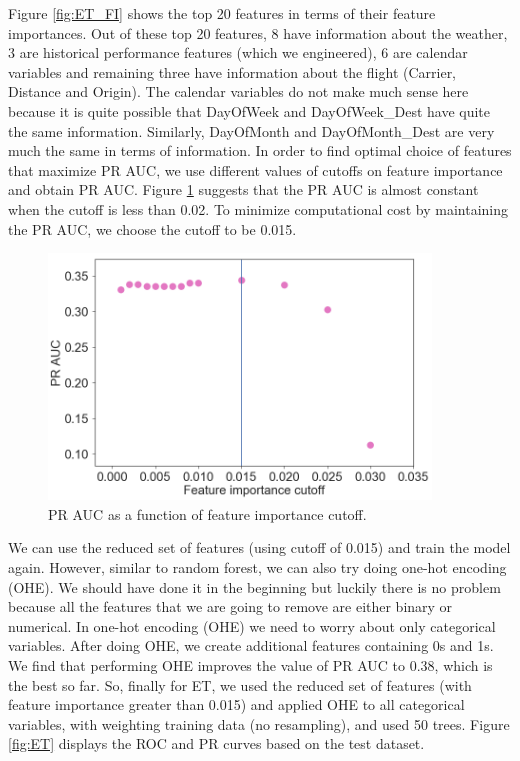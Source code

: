 \documentclass[12pt]{article}
\begin{document}
Figure \ref{fig:ET_FI} shows the top 20 features in terms of their feature importances. Out of these top 20 features, 8 have information about the weather, 3 are historical performance features (which we engineered), 6 are calendar variables and remaining three have information about the flight (Carrier, Distance and Origin). The calendar variables do not make much sense here because it is quite possible that DayOfWeek and DayOfWeek\_Dest have quite the same information. Similarly, DayOfMonth and DayOfMonth\_Dest are very much the same in terms of information. In order to find optimal choice of features that maximize PR AUC, we use different values of cutoffs on feature importance and obtain PR AUC. Figure \ref{fig:ET_FI_Cutoff} suggests that the PR AUC is almost constant when the cutoff is less than 0.02. To minimize computational cost by maintaining the PR AUC, we choose the cutoff to be 0.015. 
\begin{figure}[!h]
\begin{center}
\includegraphics[width=4in]{ET_FI_Cutoff.pdf}
\end{center}
\caption{\label{fig:ET_FI_Cutoff}
PR AUC as a function of feature importance cutoff.}
\end{figure}
We can use the reduced set of features (using cutoff of 0.015) and train the model again. However, similar to random forest, we can also try doing one-hot encoding (OHE). We should have done it in the beginning but luckily there is no problem because all the features that we are going to remove are either binary or numerical. In one-hot encoding (OHE) we need to worry about only categorical variables. After doing OHE, we create additional features containing 0s and 1s. We find that performing OHE improves the value of PR AUC to 0.38, which is the best so far. So, finally for ET, we used the reduced set of features (with feature importance greater than 0.015) and applied OHE to all categorical variables, with weighting training data (no resampling), and used 50 trees. Figure \ref{fig:ET} displays the ROC and PR curves based on the test dataset.
\end{document}
